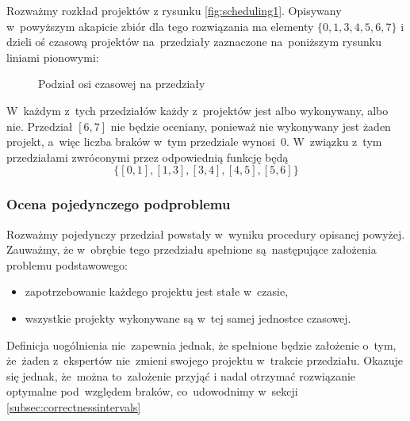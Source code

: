 \documentclass[12pt,a4paper]{article}
\theoremstyle{definition}
\begin{document}
\begin{tcolorbox}[title=Przykład --- podział oceny rozwiązania na podproblemy]
Rozważmy rozkład projektów z rysunku \ref{fig:scheduling1}.
Opisywany w~powyższym akapicie zbiór dla tego rozwiązania ma elementy $\{0, 1, 3, 4, 5, 6, 7\}$ i dzieli oś czasową projektów na~przedziały zaznaczone na~poniższym rysunku liniami pionowymi: 

\begin{figure}[H]
	\centering
	\caption{Podział osi czasowej na przedziały}
\end{figure}

W~każdym z~tych przedziałów każdy z~projektów jest albo wykonywany, albo nie.
Przedział $[6, 7]$ nie będzie oceniany, ponieważ nie wykonywany jest żaden projekt, a~więc liczba braków w~tym przedziale wynosi~0.
W~związku z~tym przedziałami zwróconymi przez odpowiednią funkcję będą
$$ \{ [0,1], [1,3], [3,4], [4,5], [5,6] \} $$
\end{tcolorbox}

\subsubsection*{Ocena pojedynczego podproblemu}
Rozważmy pojedynczy przedział powstały w~wyniku procedury opisanej powyżej.
Zauważmy, że w~obrębie tego przedziału spełnione są~następujące założenia problemu podstawowego:
\begin{itemize}
	\item zapotrzebowanie każdego projektu jest stałe w~czasie,
	\item wszystkie projekty wykonywane są w~tej samej jednostce czasowej.
\end{itemize}
Definicja uogólnienia nie~zapewnia jednak, że spełnione będzie założenie o~tym, że~żaden z~ekspertów nie~zmieni swojego projektu w~trakcie przedziału.
Okazuje się jednak, że~można to~założenie przyjąć i nadal otrzymać rozwiązanie optymalne pod~względem braków, co~udowodnimy w~sekcji \ref{subsec:correctnessintervals}\\
\end{document}
